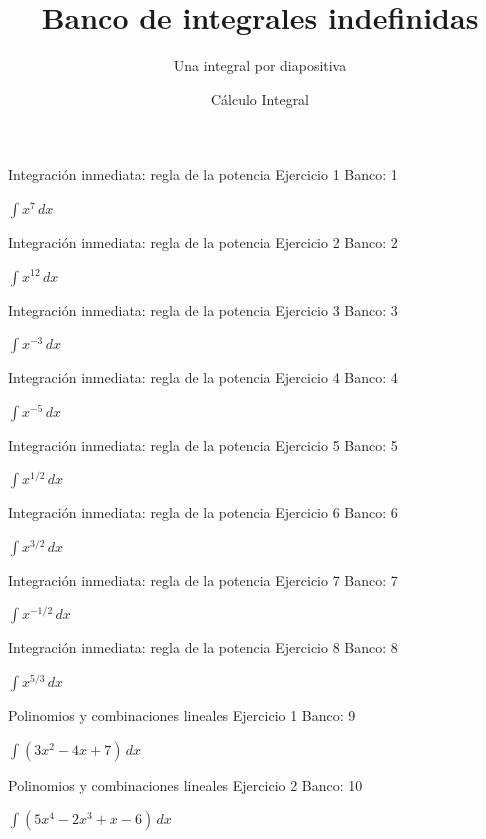 \documentclass[aspectratio=169,12pt]{beamer}
\title{Banco de integrales indefinidas}
\subtitle{Una integral por diapositiva}
\author{Cálculo Integral}
\date{}
\newcommand{\ejercicio}[1]{%
  \begin{center}
  \vfill
  {\fontsize{24}{30}\selectfont #1}
  \vfill
  \end{center}
}
\begin{document}
\begin{frame}[plain]
\titlepage
\end{frame}
\begin{frame}{Integración inmediata: regla de la potencia}
\small Ejercicio 1 \hfill Banco: 1
\ejercicio{$\displaystyle \int x^7\,dx$}
\end{frame}

\begin{frame}{Integración inmediata: regla de la potencia}
\small Ejercicio 2 \hfill Banco: 2
\ejercicio{$\displaystyle \int x^{12}\,dx$}
\end{frame}

\begin{frame}{Integración inmediata: regla de la potencia}
\small Ejercicio 3 \hfill Banco: 3
\ejercicio{$\displaystyle \int x^{-3}\,dx$}
\end{frame}

\begin{frame}{Integración inmediata: regla de la potencia}
\small Ejercicio 4 \hfill Banco: 4
\ejercicio{$\displaystyle \int x^{-5}\,dx$}
\end{frame}

\begin{frame}{Integración inmediata: regla de la potencia}
\small Ejercicio 5 \hfill Banco: 5
\ejercicio{$\displaystyle \int x^{1/2}\,dx$}
\end{frame}

\begin{frame}{Integración inmediata: regla de la potencia}
\small Ejercicio 6 \hfill Banco: 6
\ejercicio{$\displaystyle \int x^{3/2}\,dx$}
\end{frame}

\begin{frame}{Integración inmediata: regla de la potencia}
\small Ejercicio 7 \hfill Banco: 7
\ejercicio{$\displaystyle \int x^{-1/2}\,dx$}
\end{frame}

\begin{frame}{Integración inmediata: regla de la potencia}
\small Ejercicio 8 \hfill Banco: 8
\ejercicio{$\displaystyle \int x^{5/3}\,dx$}
\end{frame}

\begin{frame}{Polinomios y combinaciones lineales}
\small Ejercicio 1 \hfill Banco: 9
\ejercicio{$\displaystyle \int(3x^2-4x+7)\,dx$}
\end{frame}

\begin{frame}{Polinomios y combinaciones lineales}
\small Ejercicio 2 \hfill Banco: 10
\ejercicio{$\displaystyle \int(5x^4-2x^3+x-6)\,dx$}
\end{frame}
\end{document}
